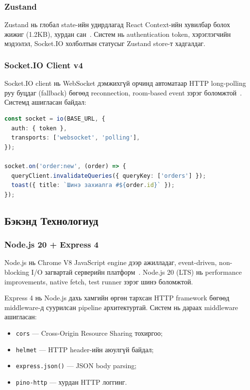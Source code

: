 \documentclass[12pt,a4paper]{article}
\begin{document}
\subsubsection{Zustand}

Zustand нь глобал state-ийн удирдлагад React Context-ийн
хувилбар болох жижиг (1.2KB), хурдан сан~\cite{zustand2024}.
Систем нь authentication token, хэрэглэгчийн мэдээлэл,
Socket.IO холболтын статусыг Zustand store-т хадгалдаг.

\subsubsection{Socket.IO Client v4}

Socket.IO client нь WebSocket дэмжихгүй орчинд автоматаар HTTP
long-polling руу буцдаг (fallback) бөгөөд reconnection, room-based
event зэрэг боломжтой~\cite{socketio2022}. Системд ашигласан байдал:

\begin{lstlisting}[language=TypeScript, caption=Socket.IO клиент холболтын жишээ]
const socket = io(BASE_URL, {
  auth: { token },
  transports: ['websocket', 'polling'],
});

socket.on('order:new', (order) => {
  queryClient.invalidateQueries({ queryKey: ['orders'] });
  toast({ title: `Шинэ захиалга #${order.id}` });
});
\end{lstlisting}

\subsection{Бэкэнд Технологиуд}

\subsubsection{Node.js 20 + Express 4}

Node.js нь Chrome V8 JavaScript engine дээр ажилладаг, event-driven,
non-blocking I/O загвартай серверийн платформ~\cite{nodejs2024}.
Node.js 20 (LTS) нь performance improvements, native fetch, test
runner зэрэг шинэ боломжтой.

Express 4 нь Node.js дахь хамгийн өргөн тархсан HTTP framework
бөгөөд middleware-д суурилсан pipeline архитектуртай. Систем нь
дараах middleware ашигласан:

\begin{itemize}
  \item \texttt{cors} --- Cross-Origin Resource Sharing тохиргоо;
  \item \texttt{helmet} --- HTTP header-ийн аюулгүй байдал;
  \item \texttt{express.json()} --- JSON body parsing;
  \item \texttt{pino-http} --- хурдан HTTP логгинг.
\end{itemize}
\end{document}
